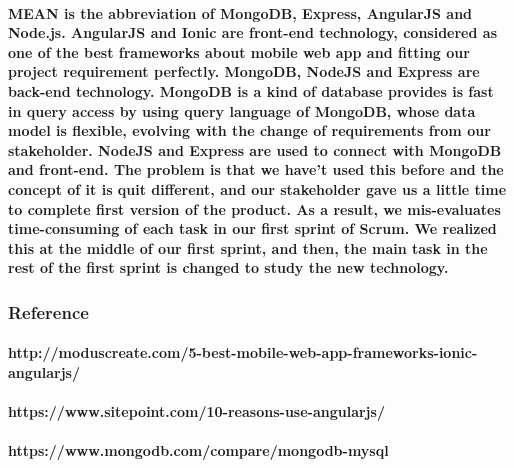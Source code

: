 \documentclass[12pt]{amsart}
\begin{document}
\paragraph{MEAN is the abbreviation of MongoDB, Express, AngularJS and Node.js. AngularJS and Ionic are front-end technology, considered as one of the best frameworks about mobile web app and fitting our project requirement perfectly. MongoDB, NodeJS and Express are back-end technology. MongoDB is a kind of database provides is fast in query access by using query language of MongoDB, whose data model is flexible, evolving with the change of requirements from our stakeholder. NodeJS and Express are used to connect with MongoDB and front-end. The problem is that we have't used this before and the concept of it is quit different, and our stakeholder gave us a little time to complete first version of the product. As a result, we mis-evaluates time-consuming of each task in our first sprint of Scrum. We realized this at the middle of our first sprint, and then, the main task in the rest of the first sprint is changed to study the new technology.}







\subsubsection{\textbf{Reference}}
\paragraph{http://moduscreate.com/5-best-mobile-web-app-frameworks-ionic-angularjs/}
\paragraph{https://www.sitepoint.com/10-reasons-use-angularjs/}
\paragraph{https://www.mongodb.com/compare/mongodb-mysql}
\end{document}
